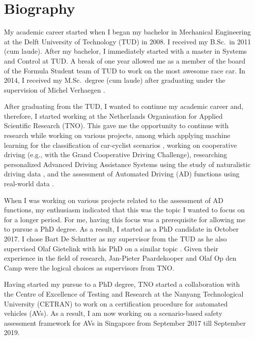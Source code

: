 \section{Biography}
\label{sec:bio}

My academic career started when I began my bachelor in Mechanical Engineering at the Delft University of Technology (TUD) in 2008. I received my B.Sc.\ in 2011 (cum laude). After my bachelor, I immediately started with a master in Systems and Control at TUD. A break of one year allowed me as a member of the board of the Formula Student team of TUD to work on the most awesome race car. In 2014, I received my M.Sc.\ degree (cum laude) after graduating under the supervision of Michel Verhaegen \cite{deGelder2015sabre}.

After graduating from the TUD, I wanted to continue my academic career and, therefore, I started working at the Netherlands Organisation for Applied Scientific Research (TNO). This gave me the opportunity to continue with research while working on various projects, among which applying machine learning for the classification of car-cyclist scenarios \cite{cara2015carcyclist}, working on cooperative driving (e.g., with the Grand Cooperative Driving Challenge), researching personalized Advanced Driving Assistance Systems using the study of naturalistic driving data \cite{gelder2016pacc}, and the assessment of Automated Driving (AD) functions using real-world data \cite{deGelder2017assessment}.

When I was working on various projects related to the assessment of AD functions, my enthusiasm indicated that this was the topic I wanted to focus on for a longer period. For me, having this focus was a prerequisite for allowing me to pursue a PhD degree. As a result, I started as a PhD candidate in October 2017. I chose Bart De Schutter as my supervisor from the TUD as he also supervised Olaf Gietelink with his PhD on a similar topic \cite{gietelink2007phd}. Given their experience in the field of research, Jan-Pieter Paardekooper and Olaf Op den Camp were the logical choices as supervisors from TNO.

Having started my pursue to a PhD degree, TNO started a collaboration with the Centre of Excellence of Testing and Research at the Nanyang Technological University (CETRAN) to work on a certification procedure for automated vehicles (AVs). As a result, I am now working on a scenario-based safety assessment framework for AVs \cite{ploeg2018cetran} in Singapore from September 2017 till September 2019. 
